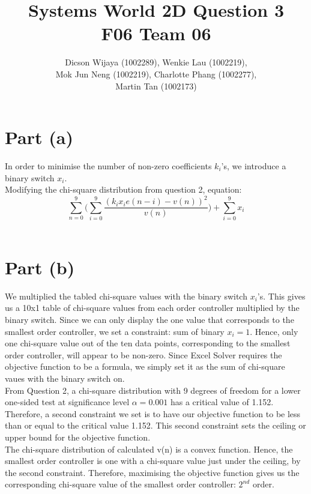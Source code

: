 \documentclass[12pt,a4paper]{article}
\author{Dicson Wijaya (1002289), Wenkie Lau (1002219), \\ Mok Jun Neng (1002219), Charlotte Phang (1002277), \\ Martin Tan (1002173)}
\title{Systems World 2D Question 3\\ F06 Team 06}
\begin{document}
	
	\maketitle
	
	\section{Part (a)}
	In order to minimise the number of non-zero coefficients $k_i$'s, we introduce a binary switch $x_i$.  \\
	
	Modifying the chi-square distribution from question 2, equation: \\
	
	$$\sum_{n=0}^{9} \bigg( \sum_{i=0}^{9} \frac{(k_i x_i e(n-i) - v(n))^2}{v(n)} \bigg) + \sum_{i=0}^{9} x_i$$ \\
	
	
	\section{Part (b)}
	We multiplied the tabled chi-square values with the binary switch $x_i$'s. This gives us a 10x1 table of chi-square values from each order controller multiplied by the binary switch. Since we can only display the one value that corresponds to the smallest order controller, we set a constraint: sum of binary $x_i = 1$. Hence, only one chi-square value out of the ten data points, corresponding to the smallest order controller, will appear to be non-zero. Since Excel Solver requires the objective function to be a formula, we simply set it as the sum of chi-square vaues with the binary switch on. \\
	
	From Question 2, a chi-square distribution with 9 degrees of freedom for a lower one-sided test at significance level $\alpha = 0.001$ has a critical value of 1.152. Therefore, a second constraint we set is to have our objective function to be less than or equal to the critical value 1.152. This second constraint sets the ceiling or upper bound for the objective function. \\
	
	The chi-square distribution of calculated v(n) is a convex function. Hence, the smallest order controller is one with a chi-square value just under the ceiling, by the second constraint. Therefore, maximising the objective function gives us the corresponding chi-square value of the smallest order controller: $2^{nd}$ order.
	
	
\end{document}
